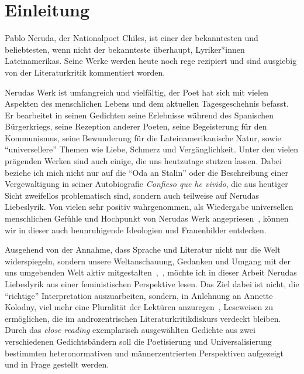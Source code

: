 \section{Einleitung}

Pablo Neruda, der Nationalpoet Chiles, ist einer der bekanntesten und beliebtesten, wenn nicht der bekannteste überhaupt, Lyriker*innen Lateinamerikas.
Seine Werke werden heute noch rege rezipiert und sind ausgiebig von der Literaturkritik kommentiert worden.


Nerudas Werk ist umfangreich und vielfältig, der Poet hat sich mit vielen Aspekten des menschlichen Lebens und dem aktuellen Tagesgeschehnis befasst.
Er bearbeitet in seinen Gedichten seine Erlebnisse während des Spanischen Bürgerkriegs, seine Rezeption anderer Poeten, seine Begeisterung für den Kommunismus, seine Bewunderung für die Lateinamerikanische Natur, sowie ``universellere'' Themen wie Liebe, Schmerz und Vergänglichkeit.
Unter den vielen prägenden Werken sind auch einige, die uns heutzutage stutzen lassen.
Dabei beziehe ich mich nicht nur auf die ``Oda an Stalin'' oder die Beschreibung einer Vergewaltigung in seiner Autobiografie \textit{Confieso que he vivido}, die aus heutiger Sicht zweifellos problematisch sind, sondern auch teilweise auf Nerudas Liebeslyrik.
Von vielen sehr positiv wahrgenommen, als Wiedergabe universellen menschlichen Gefühle und Hochpunkt von Nerudas Werk angepriesen~\cite{Eandi}, %
können wir in dieser auch beunruhigende Ideologien und Frauenbilder entdecken.


Ausgehend von der Annahme, dass Sprache und Literatur nicht nur die Welt widerspiegeln, sondern unsere Weltanschauung, Gedanken und Umgang mit der uns umgebenden Welt aktiv mitgestalten~\cite{Kolodny1980},~\cite{North2013},
möchte ich in dieser Arbeit Nerudas Liebeslyrik aus einer feministischen Perspektive lesen.
Das Ziel dabei ist nicht, die ``richtige'' Interpretation auszuarbeiten, sondern, in Anlehnung an Annette Kolodny, viel mehr eine Pluralität der Lektüren anzuregen~\cite{Kolodny1980}, Leseweisen zu ermöglichen, die im androzentrischen Literaturkritikdiskurs verdeckt bleiben.
Durch das \textit{close reading} exemplarisch ausgewählten Gedichte aus zwei verschiedenen Gedichtsbändern soll die Poetisierung und Universalisierung bestimmten heteronormativen und männerzentrierten Perspektiven aufgezeigt und in Frage gestellt werden.


